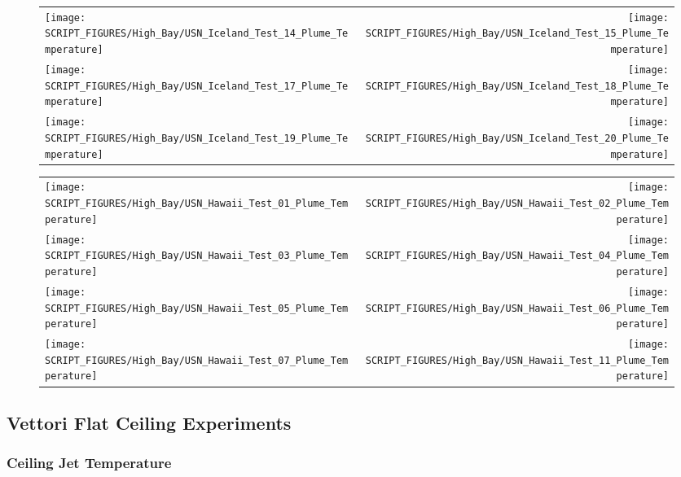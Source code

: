 \begin{figure}[!ht]
\begin{tabular*}{\textwidth}{l@{\extracolsep{\fill}}r}
\texttt{[image: SCRIPT\_FIGURES/High\_Bay/USN\_Iceland\_Test\_14\_Plume\_Temperature]} &
\texttt{[image: SCRIPT\_FIGURES/High\_Bay/USN\_Iceland\_Test\_15\_Plume\_Temperature]} \\
\texttt{[image: SCRIPT\_FIGURES/High\_Bay/USN\_Iceland\_Test\_17\_Plume\_Temperature]} &
\texttt{[image: SCRIPT\_FIGURES/High\_Bay/USN\_Iceland\_Test\_18\_Plume\_Temperature]} \\
\texttt{[image: SCRIPT\_FIGURES/High\_Bay/USN\_Iceland\_Test\_19\_Plume\_Temperature]} &
\texttt{[image: SCRIPT\_FIGURES/High\_Bay/USN\_Iceland\_Test\_20\_Plume\_Temperature]} \\
\end{tabular*}
\label{USN_Plume_Iceland_3}
\end{figure}

\begin{figure}[!ht]
\begin{tabular*}{\textwidth}{l@{\extracolsep{\fill}}r}
\texttt{[image: SCRIPT\_FIGURES/High\_Bay/USN\_Hawaii\_Test\_01\_Plume\_Temperature]} &
\texttt{[image: SCRIPT\_FIGURES/High\_Bay/USN\_Hawaii\_Test\_02\_Plume\_Temperature]} \\
\texttt{[image: SCRIPT\_FIGURES/High\_Bay/USN\_Hawaii\_Test\_03\_Plume\_Temperature]} &
\texttt{[image: SCRIPT\_FIGURES/High\_Bay/USN\_Hawaii\_Test\_04\_Plume\_Temperature]} \\
\texttt{[image: SCRIPT\_FIGURES/High\_Bay/USN\_Hawaii\_Test\_05\_Plume\_Temperature]} &
\texttt{[image: SCRIPT\_FIGURES/High\_Bay/USN\_Hawaii\_Test\_06\_Plume\_Temperature]} \\
\texttt{[image: SCRIPT\_FIGURES/High\_Bay/USN\_Hawaii\_Test\_07\_Plume\_Temperature]} &
\texttt{[image: SCRIPT\_FIGURES/High\_Bay/USN\_Hawaii\_Test\_11\_Plume\_Temperature]}
\end{tabular*}
\label{USN_Plume_Hawaii}
\end{figure}

\clearpage

\subsection{Vettori Flat Ceiling Experiments}
\label{Vettori_Flat_Results}

\subsubsection{Ceiling Jet Temperature}

